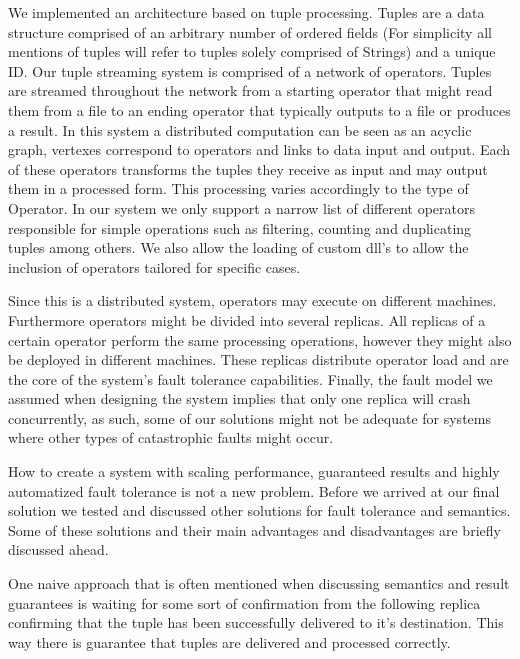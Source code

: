 \documentclass[times, 10pt,twocolumn]{article}
\begin{document}
	We implemented an architecture based on tuple processing. Tuples 
are a data structure comprised of an arbitrary number of ordered fields 
(For simplicity all mentions of tuples will refer to tuples solely comprised
 of Strings) and a unique ID. Our tuple streaming system is comprised of a 
 network of operators. Tuples are streamed throughout the 
network from a starting operator that might read them from
a file to an ending operator that typically outputs to a file or 
produces a result. In this system a distributed computation 
can be seen as an acyclic graph, vertexes correspond to operators 
and links to data input and output. Each of these operators transforms 
the tuples they receive as input and may output them in a processed 
form. This processing varies accordingly to the type of Operator.
In our system we only support a narrow list of different operators
responsible for simple operations such as filtering, counting and
duplicating tuples among others. We also allow the loading of custom 
dll's to allow the inclusion of operators tailored for specific cases.

	Since this is a distributed system, operators may execute on 
different machines. Furthermore operators might be divided into
several replicas. All replicas of a certain operator perform the same 
processing operations, however they might also be deployed in different 
machines. These replicas distribute operator load and are the 
core of the system's fault tolerance capabilities. 
	Finally, the fault model we assumed when designing the system implies
that only one replica will crash concurrently, as such, some of our 
solutions might not be adequate for systems where other types of
catastrophic faults might occur.


	How to create a system with scaling performance, guaranteed results 
and highly automatized fault tolerance is not a new problem. Before we
arrived at our final solution we tested and discussed other solutions
for fault tolerance and semantics. Some of these solutions and their main 
advantages and disadvantages are briefly discussed ahead.


	One naive approach that is often mentioned when discussing semantics and 
result guarantees is waiting for some sort of confirmation from the 
following replica confirming that the tuple has been successfully delivered
to it's destination. This way there is guarantee that tuples are delivered 
and processed correctly. 
\end{document}
